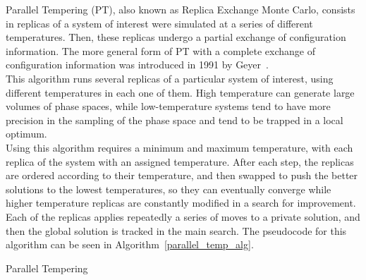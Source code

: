 Parallel Tempering (PT), also known as Replica Exchange Monte Carlo, consists in replicas of a system of interest were simulated at a series of different temperatures. Then, these replicas undergo a partial exchange of configuration information. The more general form of PT with a complete exchange of configuration information was introduced in 1991 by Geyer~\cite{B509983H}. \\

This algorithm runs several replicas of a particular system of interest, using different temperatures in each one of them. High temperature can generate large volumes of phase spaces, while low-temperature systems tend to have more precision in the sampling of the phase space and tend to be trapped in a local optimum. \\

Using this algorithm requires a minimum and maximum temperature, with each replica of the system with an assigned temperature. After each step, the replicas are ordered according to their temperature, and then swapped to push the better solutions to the lowest temperatures, so they can eventually converge while higher temperature replicas are constantly modified in a search for improvement. Each of the replicas applies repeatedly a series of moves to a private solution, and then the global solution is tracked in the main search. The pseudocode for this algorithm can be seen in Algorithm~\ref{parallel_temp_alg}.\\

\begin{algorithm}[H]
\caption{Parallel Tempering}
\label{parallel_temp_alg}
\SetAlgoLined
{}
\end{algorithm}

